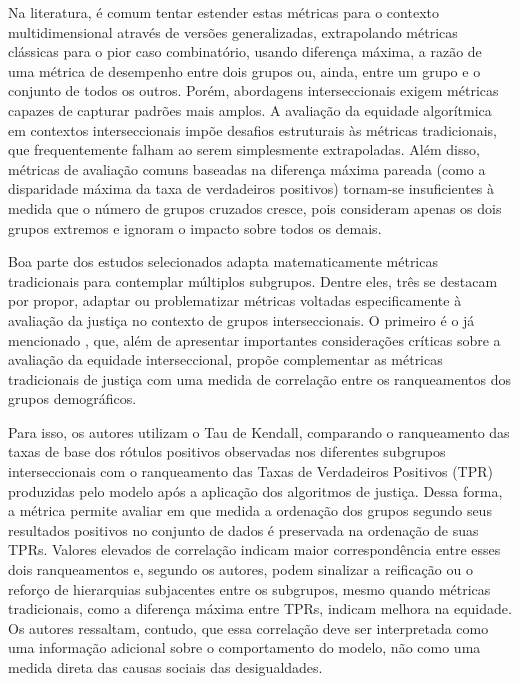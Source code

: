 Na literatura, é comum tentar estender estas métricas para o contexto multidimensional através de versões generalizadas, extrapolando métricas clássicas para o pior caso combinatório, usando diferença máxima, a razão de uma métrica de desempenho entre dois grupos ou, ainda, entre um grupo e o conjunto de todos os outros. Porém, abordagens interseccionais exigem métricas capazes de capturar padrões mais amplos. A avaliação da equidade algorítmica em contextos interseccionais impõe desafios estruturais às métricas tradicionais, que frequentemente falham ao serem simplesmente extrapoladas. Além disso, métricas de avaliação comuns baseadas na diferença máxima pareada (como a disparidade máxima da taxa de verdadeiros positivos) tornam-se insuficientes à medida que o número de grupos cruzados cresce, pois consideram apenas os dois grupos extremos e ignoram o impacto sobre todos os demais.

Boa parte dos estudos selecionados adapta matematicamente métricas tradicionais para contemplar múltiplos subgrupos. Dentre eles, três se destacam por propor, adaptar ou problematizar métricas voltadas especificamente à avaliação da justiça no contexto de grupos interseccionais. O primeiro é o já mencionado \citet{wang2022towards}, que, além de apresentar importantes considerações críticas sobre a avaliação da equidade interseccional, propõe complementar as métricas tradicionais de justiça com uma medida de correlação entre os ranqueamentos dos grupos demográficos.

Para isso, os autores utilizam o Tau de Kendall, comparando o ranqueamento das taxas de base dos rótulos positivos observadas nos diferentes subgrupos interseccionais com o ranqueamento das Taxas de Verdadeiros Positivos (TPR) produzidas pelo modelo após a aplicação dos algoritmos de justiça. Dessa forma, a métrica permite avaliar em que medida a ordenação dos grupos segundo seus resultados positivos no conjunto de dados é preservada na ordenação de suas TPRs. Valores elevados de correlação indicam maior correspondência entre esses dois ranqueamentos e, segundo os autores, podem sinalizar a reificação ou o reforço de hierarquias subjacentes entre os subgrupos, mesmo quando métricas tradicionais, como a diferença máxima entre TPRs, indicam melhora na equidade. Os autores ressaltam, contudo, que essa correlação deve ser interpretada como uma informação adicional sobre o comportamento do modelo, não como uma medida direta das causas sociais das desigualdades.

